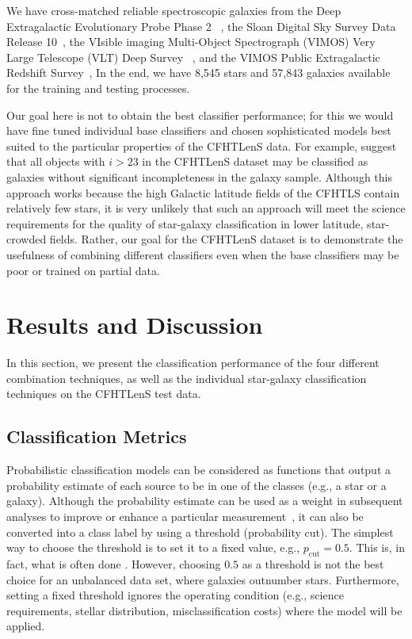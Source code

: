 \documentclass[useAMS,usenatbib]{mn2e}
\newcommand{\eg}{{e.g., }}
\begin{document}
We have cross-matched reliable spectroscopic galaxies from
the Deep Extragalactic Evolutionary Probe Phase 2~
\citep[DEEP2;][]{Davis2003,Newman2013a},
the Sloan Digital Sky Survey Data Release 10~\citep[SDSS-DR10]{Ahn2014},
the VIsible imaging Multi-Object Spectrograph (VIMOS)
Very Large Telescope (VLT) Deep Survey~
\citep[VVDS;][]{LeFevre2005,Garilli2008}, and
the VIMOS Public Extragalactic Redshift Survey~\citep[VIPERS;][]{Garilli2014},
In the end, we have 8,545 stars and 57,843 galaxies available
for the training and testing processes.

Our goal here is not to obtain the best classifier
performance; for this we would have fine tuned individual base
classifiers and chosen sophisticated models best suited to the
particular properties of the CFHTLenS data.
For example, \cite{Hildebrandt2012} suggest that
all objects with $i > 23$ in the CFHTLenS dataset
may be classified as galaxies
without significant incompleteness in the galaxy sample.
Although this approach works because
the high Galactic latitude fields of the CFHTLS contain
relatively few stars,
it is very unlikely that such an approach
will meet the science requirements for the quality of
star-galaxy classification in lower latitude, star-crowded fields.
Rather, our goal for the CFHTLenS dataset
is to demonstrate the usefulness
of combining different classifiers even when
the base classifiers may be poor or trained on partial data.

\section{Results and Discussion}
  \label{section:results_and_discussion}

In this section, we present the classification performance of
the four different combination techniques,
as well as the individual star-galaxy classification techniques
on the CFHTLenS test data.


\subsection{Classification Metrics}

Probabilistic classification models can be considered as
functions that output a probability estimate of each source
to be in one of the classes (\eg a star or a galaxy).
Although the probability estimate can be used as a weight 
in subsequent analyses to improve or enhance
a particular measurement~\citep{ross2011ameliorating},
it can also be converted into a class label
by using a threshold (probability cut).
The simplest way to choose the threshold is to set it to a fixed value,
\eg $p_\mathrm{cut} = 0.5$.
This is, in fact, what is often done
\citep[\eg][]{henrion2011bayesian, Fadely2012}.
However, choosing $0.5$ as a threshold is not the best choice
for an unbalanced data set, where galaxies outnumber stars.
Furthermore, setting a fixed threshold ignores the operating condition 
(\eg science requirements, stellar distribution, misclassification costs)
where the model will be applied.
\end{document}

